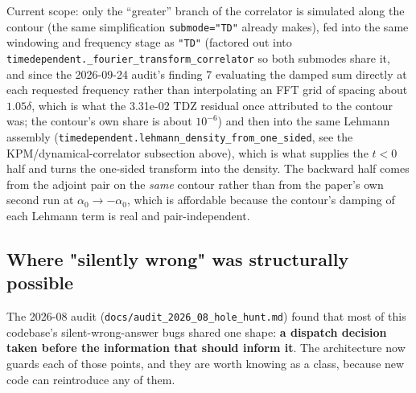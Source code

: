 \documentclass[11pt]{article}
\begin{document}
Current scope: only the ``greater'' branch of the correlator is
simulated along the contour (the same simplification
\texttt{submode="TD"} already makes),
fed into the same windowing and frequency stage as \texttt{"TD"}
(factored out into
\texttt{timedependent.\_fourier\_transform\_correlator} so both
submodes share it, and since the 2026-09-24 audit's finding 7 evaluating
the damped sum directly at each requested frequency rather than
interpolating an FFT grid of spacing about $1.05\delta$, which is what
the 3.31e-02 TDZ residual once attributed to the contour was; the
contour's own share is about $10^{-6}$) and then into the same Lehmann assembly
(\texttt{timedependent.lehmann\_density\_from\_one\_sided}, see the
KPM/dynamical-correlator subsection above), which is what supplies the
$t<0$ half and turns the one-sided transform into the density. The
backward half comes from the adjoint pair on the \emph{same} contour
rather than from the paper's own second run at
$\alpha_0 \to -\alpha_0$, which is affordable because the contour's
damping of each Lehmann term is real and pair-independent.

\subsection{Where "silently wrong" was structurally possible}

The 2026-08 audit (\texttt{docs/audit\_2026\_08\_hole\_hunt.md}) found that
most of this codebase's silent-wrong-answer bugs shared one shape:
\textbf{a dispatch decision taken before the information that should
inform it}. The architecture now guards each of those points, and they are
worth knowing as a class, because new code can reintroduce any of them.
\end{document}
